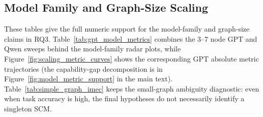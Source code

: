\subsection{Model Family and Graph-Size Scaling}
\label{app:model_scale_results}
\label{app:full_experiment_tables}

These tables give the full numeric support for the model-family and
graph-size claims in RQ3. Table~\ref{tab:gpt_model_metrics} combines the
3--7 node GPT and Qwen sweeps behind the model-family radar plots, while
Figure~\ref{fig:scaling_metric_curves} shows the corresponding GPT absolute
metric trajectories (the capability-gap decomposition is in
Figure~\ref{fig:model_metric_support} in the main text).
Table~\ref{tab:simple_graph_imec} keeps the small-graph ambiguity diagnostic:
even when task accuracy is high, the final hypotheses do not necessarily
identify a singleton SCM.

